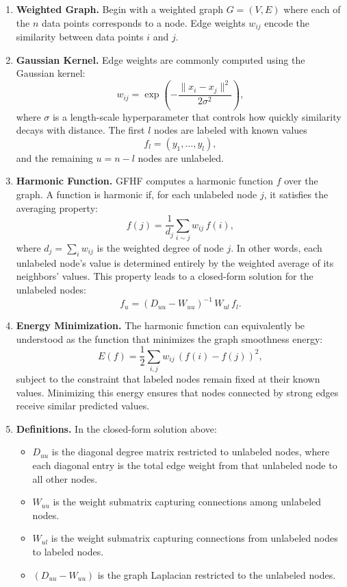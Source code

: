 \documentclass{article}
\begin{document}
\begin{enumerate}

\item \textbf{Weighted Graph.}
Begin with a weighted graph $G = (V, E)$ where each of the $n$ data points corresponds to a node. Edge weights $w_{ij}$ encode the similarity between data points $i$ and $j$.

\item \textbf{Gaussian Kernel.}
Edge weights are commonly computed using the Gaussian kernel:
\[
w_{ij} = \exp\!\left(-\frac{\|x_i - x_j\|^2}{2\sigma^2}\right),
\]
where $\sigma$ is a length-scale hyperparameter that controls how quickly similarity decays with distance. The first $l$ nodes are labeled with known values
\[
f_l = (y_1, \ldots, y_l),
\]
and the remaining $u = n - l$ nodes are unlabeled.

\item \textbf{Harmonic Function.}
GFHF computes a harmonic function $f$ over the graph. A function is harmonic if, for each unlabeled node $j$, it satisfies the averaging property:
\[
f(j) = \frac{1}{d_j} \sum_{i \sim j} w_{ij}\, f(i),
\]
where $d_j = \sum_{i} w_{ij}$ is the weighted degree of node $j$. In other words, each unlabeled node's value is determined entirely by the weighted average of its neighbors' values. This property leads to a closed-form solution for the unlabeled nodes:
\[
f_u = (D_{uu} - W_{uu})^{-1}\, W_{ul}\, f_l.
\]

\item \textbf{Energy Minimization.}
The harmonic function can equivalently be understood as the function that minimizes the graph smoothness energy:
\[
E(f) = \frac{1}{2} \sum_{i,j} w_{ij}\,(f(i) - f(j))^2,
\]
subject to the constraint that labeled nodes remain fixed at their known values. Minimizing this energy ensures that nodes connected by strong edges receive similar predicted values.

\item \textbf{Definitions.}
In the closed-form solution above:
\begin{itemize}
\item $D_{uu}$ is the diagonal degree matrix restricted to unlabeled nodes, where each diagonal entry is the total edge weight from that unlabeled node to all other nodes.
\item $W_{uu}$ is the weight submatrix capturing connections among unlabeled nodes.
\item $W_{ul}$ is the weight submatrix capturing connections from unlabeled nodes to labeled nodes.
\item $(D_{uu} - W_{uu})$ is the graph Laplacian restricted to the unlabeled nodes.
\end{itemize}

\end{enumerate}
\end{document}
